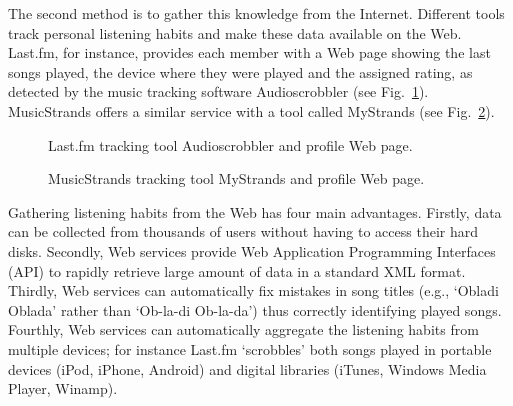 The second method is to gather this knowledge from the Internet.
Different tools track personal listening habits and make these data available on the Web.
Last.fm, for instance, provides each member with a Web page showing the last songs played, the device where they were played and the assigned rating, as detected by the music tracking software Audioscrobbler (see Fig.~\ref{fig:lastfmprofile}).
MusicStrands offers a similar service with a tool called MyStrands (see Fig.~\ref{fig:musicstrands}).
%
\begin{figure}[bthp]
\centering \setlength{\abovecaptionskip}{3pt}
\caption{Last.fm tracking tool Audioscrobbler and profile Web page.}
\label{fig:lastfmprofile}
\end{figure}
%
\begin{figure}[bthp]
\centering \setlength{\abovecaptionskip}{3pt}
\caption{MusicStrands tracking tool MyStrands and profile Web page.}
\label{fig:musicstrands}
\end{figure}

Gathering listening habits from the Web has four main advantages.
Firstly, data can be collected from thousands of users without having to access their hard disks.
Secondly, Web services provide Web Application Programming Interfaces (API) \cite{Booth04} to rapidly retrieve large amount of data in a standard XML format.
Thirdly, Web services can automatically fix mistakes in song titles (e.g., `Obladi Oblada' rather than `Ob-la-di Ob-la-da') thus correctly identifying played songs.
Fourthly, Web services can automatically aggregate the listening habits from multiple devices; for instance Last.fm `scrobbles' both songs played in portable devices (iPod, iPhone, Android) and digital libraries (iTunes, Windows Media Player, Winamp).



